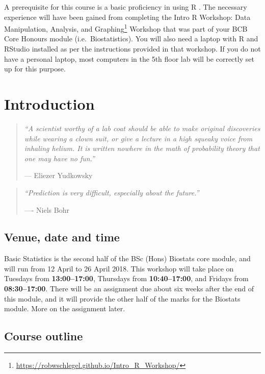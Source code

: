 \documentclass[english,10pt,a4paper,oneside]{book}
\renewcommand{\href}[2]{#2\footnote{\url{#1}}}
\let\rmarkdownfootnote\footnote%
\def\footnote{\protect\rmarkdownfootnote}
\theoremstyle{definition}
\theoremstyle{definition}
\theoremstyle{definition}
\theoremstyle{remark}
\begin{document}
A prerequisite for this course is a basic proficiency in using R
\citep{R2017}. The necessary experience will have been gained from
completing the
\href{https://robwschlegel.github.io/Intro_R_Workshop/}{Intro R
Workshop: Data Manipulation, Analysis, and Graphing} Workshop that was
part of your BCB Core Honours module (i.e.~Biostatistics). You will also
need a laptop with R and RStudio installed as per the instructions
provided in that workshop. If you do not have a personal laptop, most
computers in the 5th floor lab will be correctly set up for this
purpose.

\hypertarget{introduction}{%
\chapter{Introduction}\label{introduction}}

\begin{quote}
\emph{\enquote{A scientist worthy of a lab coat should be able to make
original discoveries while wearing a clown suit, or give a lecture in a
high squeaky voice from inhaling helium. It is written nowhere in the
math of probability theory that one may have no fun.}}

--- Eliezer Yudkowsky
\end{quote}

\begin{quote}
\emph{\enquote{Prediction is very difficult, especially about the
future.}}

---- Niels Bohr
\end{quote}

\hypertarget{venue-date-and-time}{%
\section{Venue, date and time}\label{venue-date-and-time}}

Basic Statistics is the second half of the BSc (Hons) Biostats core
module, and will run from 12 April to 26 April 2018. This workshop will
take place on Tuesdays from \textbf{13:00--17:00}, Thursdays from
\textbf{10:40--17:00}, and Fridays from \textbf{08:30--17:00}. There
will be an assignment due about six weeks after the end of this module,
and it will provide the other half of the marks for the Biostats module.
More on the assignment later.

\hypertarget{course-outline}{%
\section{Course outline}\label{course-outline}}
\end{document}
